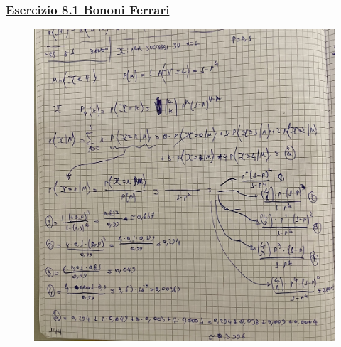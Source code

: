 \documentclass{article}
\begin{document}
\subsubsection{\underline{Esercizio 8.1 Bononi Ferrari}}
\begin{figure}[H]
\centering
\includegraphics[scale=0.10]{ese/40.jpeg}
\end{figure}
\end{document}
